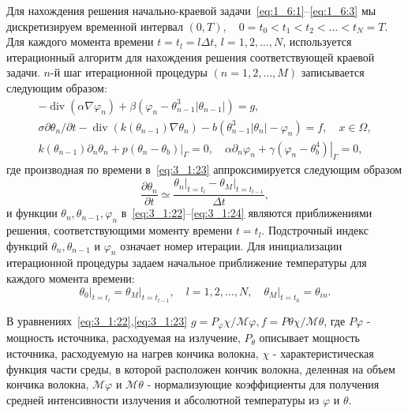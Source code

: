 Для нахождения решения начально-краевой
задачи~\eqref{eq:1_6:1}--\eqref{eq:1_6:3}
мы дискретизируем временной интервал
$(0, T), \quad 0=t_{0}<t_{1}<t_{2}<\ldots<t_{N}=T$.
Для каждого момента времени $t=t_{l}=l \Delta t$, $l=1,2, \ldots, N$,
используется итерационный алгоритм для нахождения решения соответствующей
краевой задачи. $n$-й шаг итерационной процедуры $(n=1,2, \ldots, M)$
записывается следующим образом:
\begin{gather}
    -\operatorname{div}\left(\alpha \nabla \varphi_{n}\right)
    +\beta\left(\varphi_{n}-\theta_{n-1}^{3}
    \left|\theta_{n-1}\right|\right)=g, \label{eq:3_1:22}\\
    \sigma \partial \theta_{n} / \partial t
    -\operatorname{div}\left(k\left(\theta_{n-1}\right)
    \nabla \theta_{n}\right)
    -b\left(\theta_{n-1}^{3}\left|\theta_{n}\right|
    -\varphi_{n}\right)=f, \quad x \in \Omega, \label{eq:3_1:23}\\
    k\left(\theta_{n-1}\right) \partial_{n} \theta_{n}
    +\left.p\left(\theta_{n}-\theta_{b}\right)\right|_{\Gamma}=0,
    \quad \alpha \partial_{n} \varphi_{n}+\left.\gamma
    \left(\varphi_{n}-\theta_{b}^{4}\right)\right|_{\Gamma}=0,\label{eq:3_1:24}
\end{gather}
где производная по времени в~\eqref{eq:3_1:23}
аппроксимируется следующим образом
\[
    \frac{\partial \theta_{n}}{\partial t} \simeq
    \frac{
        \left.\theta_{n}\right|_{t=t_{l}}
        -\left.\theta_{M}\right|_{t=t_{l-1}}
    }{\Delta t},
\]
и функции $\theta_{n}, \theta_{n-1}, \varphi_{n}$
в~\eqref{eq:3_1:22}--\eqref{eq:3_1:24} являются приближениями решения,
соответствующими моменту времени $t=t_{l}$.
Подстрочный индекс функций
$\theta_{n}, \theta_{n-1}$ и $\varphi_{n}$ означает номер итерации.
Для инициализации итерационной процедуры задаем начальное приближение
температуры для каждого момента времени:
\begin{equation}
    \label{eq:3_1:25}
    \left.\theta_{0}\right|_{t=t_{l}}=
    \left.\theta_{M}\right|_{t=t_{l-1}},
    \quad l=1,2, \ldots, N, \left.\quad
    \theta_{M}\right|_{t=t_{0}}=\theta_{i n}.
\end{equation}

В уравнениях~\eqref{eq:3_1:22},\eqref{eq:3_1:23}
$g=P_{\varphi} \chi / \mathcal{M}{\varphi},
f=P{\theta} \chi / \mathcal{M}{\theta}$,
где $P{\varphi}$ - мощность источника, расходуемая на излучение,
$P_{\theta}$ описывает мощность источника, расходуемую на нагрев
кончика волокна, $\chi$ - характеристическая функция части среды,
в которой расположен кончик волокна, деленная на объем кончика волокна,
$\mathcal{M}{\varphi}$ и $\mathcal{M}{\theta}$ - нормализующие коэффициенты
для получения средней интенсивности излучения
и абсолютной температуры из $\varphi$ и $\theta$.

